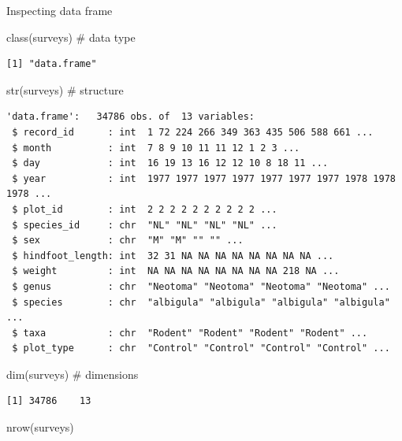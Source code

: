\documentclass[
  letterpaper,
  DIV=11,
  numbers=noendperiod]{scrreprt}
\newenvironment{Shaded}{\begin{snugshade}}{\end{snugshade}}
\newcommand{\CommentTok}[1]{\textcolor[rgb]{0.37,0.37,0.37}{#1}}
\newcommand{\FunctionTok}[1]{\textcolor[rgb]{0.28,0.35,0.67}{#1}}
\newcommand{\NormalTok}[1]{\textcolor[rgb]{0.00,0.23,0.31}{#1}}
\begin{document}
Inspecting data frame

\begin{Shaded}
\begin{Highlighting}[]
\FunctionTok{class}\NormalTok{(surveys)  }\CommentTok{\# data type}
\end{Highlighting}
\end{Shaded}

\begin{verbatim}
[1] "data.frame"
\end{verbatim}

\begin{Shaded}
\begin{Highlighting}[]
\FunctionTok{str}\NormalTok{(surveys)      }\CommentTok{\# structure}
\end{Highlighting}
\end{Shaded}

\begin{verbatim}
'data.frame':   34786 obs. of  13 variables:
 $ record_id      : int  1 72 224 266 349 363 435 506 588 661 ...
 $ month          : int  7 8 9 10 11 11 12 1 2 3 ...
 $ day            : int  16 19 13 16 12 12 10 8 18 11 ...
 $ year           : int  1977 1977 1977 1977 1977 1977 1977 1978 1978 1978 ...
 $ plot_id        : int  2 2 2 2 2 2 2 2 2 2 ...
 $ species_id     : chr  "NL" "NL" "NL" "NL" ...
 $ sex            : chr  "M" "M" "" "" ...
 $ hindfoot_length: int  32 31 NA NA NA NA NA NA NA NA ...
 $ weight         : int  NA NA NA NA NA NA NA NA 218 NA ...
 $ genus          : chr  "Neotoma" "Neotoma" "Neotoma" "Neotoma" ...
 $ species        : chr  "albigula" "albigula" "albigula" "albigula" ...
 $ taxa           : chr  "Rodent" "Rodent" "Rodent" "Rodent" ...
 $ plot_type      : chr  "Control" "Control" "Control" "Control" ...
\end{verbatim}

\begin{Shaded}
\begin{Highlighting}[]
\FunctionTok{dim}\NormalTok{(surveys)      }\CommentTok{\# dimensions}
\end{Highlighting}
\end{Shaded}

\begin{verbatim}
[1] 34786    13
\end{verbatim}

\begin{Shaded}
\begin{Highlighting}[]
\FunctionTok{nrow}\NormalTok{(surveys)}
\end{Highlighting}
\end{Shaded}
\end{document}
